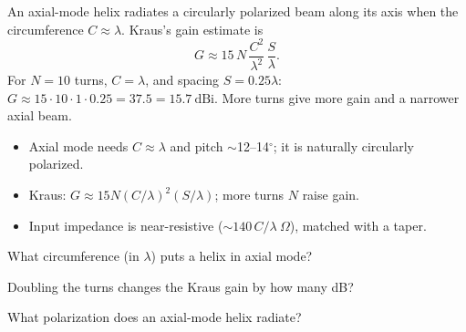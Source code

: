 \begin{workedexample}
An axial-mode helix radiates a circularly polarized beam along its axis
when the circumference $C \approx \lambda$. Kraus's gain estimate is
\[ G \approx 15\,N\,\frac{C^2}{\lambda^2}\,\frac{S}{\lambda}. \]
For $N = 10$ turns, $C = \lambda$, and spacing $S = 0.25\lambda$:
$G \approx 15\cdot10\cdot1\cdot0.25 = 37.5 = 15.7\ \text{dBi}$. More turns give
more gain and a narrower axial beam.
\end{workedexample}

\begin{keytakeaways}
\begin{itemize}[leftmargin=1.4em,itemsep=2pt]
\item Axial mode needs $C \approx \lambda$ and pitch $\sim$12--14$^{\circ}$; it is naturally circularly polarized.
\item Kraus: $G \approx 15N(C/\lambda)^2(S/\lambda)$; more turns $N$ raise gain.
\item Input impedance is near-resistive ($\sim140\,C/\lambda\ \Omega$), matched with a taper.
\end{itemize}
\end{keytakeaways}

\begin{exercises}
\item What circumference (in $\lambda$) puts a helix in axial mode?
\item Doubling the turns changes the Kraus gain by how many dB?
\item What polarization does an axial-mode helix radiate?
\end{exercises}

